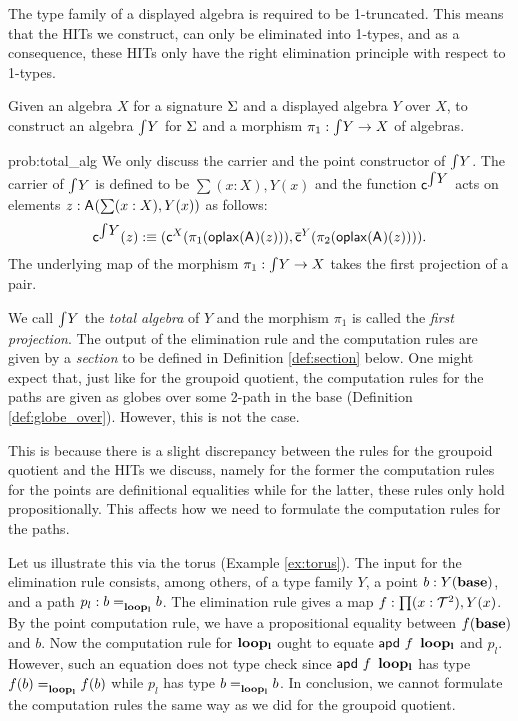 \begin{remark}
The type family of a displayed algebra is required to be 1-truncated.
This means that the HITs we construct, can only be eliminated into
1-types, and as a consequence, these HITs only have the right
elimination principle with respect to 1-types.
\end{remark}

\begin{problem}
\label{prob:total_alg}
Given an algebra $X$ for a signature $\Sigma$ and a displayed algebra $Y$ over $X$,
to construct an algebra $\textstyle \int_{}{Y}$ for $\Sigma$ and a morphism $\pi_1 : \textstyle \int_{}{Y} \rightarrow X$ of algebras.
\end{problem}

\begin{construction}{prob:total_alg}
\label{constr:total_alg}
We only discuss the carrier and the point constructor of $\textstyle \int_{}{Y}$.
The carrier of $\textstyle \int_{}{Y}$ is defined to be $\sum (x : X), Y(x)$
and the function $\mathsf{c}^{\textstyle \int_{}{Y}}$ acts on elements $z : \mathsf{A}^{}(\sum (x : X), Y(x))$ as follows:
\[
\mathsf{c}^{\textstyle \int_{}{Y}}(z) :\equiv
(\mathsf{c}^{X}(\pi_1(\mathsf{oplax}(\mathsf{A}^{})(z)))
,
\overline{\mathsf{c}}^{Y}(\pi_2(\mathsf{oplax}(\mathsf{A}^{})(z)))).
\]
The underlying map of the morphism $\pi_1 : \textstyle \int_{}{Y} \rightarrow X$ takes the first projection of a pair.
\end{construction}

We call $\textstyle \int_{}{Y}$ the \emph{total algebra} of $Y$ and the morphism $\pi_1$ is called the \emph{first projection}.
The output of the elimination rule and the computation rules are given by a \emph{section} to be defined in Definition \ref{def:section} below.
One might expect that, just like for the groupoid quotient, the computation rules for the paths
are given as globes over some 2-path in the base (Definition \ref{def:globe_over}).
However, this is not the case.

This is because there is a slight discrepancy between the rules for the groupoid quotient and the HITs we discuss,
namely for the former the computation rules for the points are definitional equalities
while for the latter, these rules only hold propositionally.
This affects how we need to formulate the computation rules for the paths.

Let us illustrate this via the torus (Example \ref{ex:torus}).
The input for the elimination rule consists, among others, of a type family $Y$, a point $b : Y(\operatorname{\mathbf{base}})$,
and a path $p_l : b =_{\operatorname{\mathbf{loop_l}}}^{} b$.
The elimination rule gives a map $f : \prod (x : \mathcal{T}^2) , Y(x)$.
By the point computation rule, we have a propositional equality between $f(\operatorname{\mathbf{base}})$ and $b$.
Now the computation rule for $\operatorname{\mathbf{loop_l}}$ ought to equate $\mathsf{apd} \ f \ \operatorname{\mathbf{loop_l}}$ and $p_l$.
However, such an equation does not type check since $\mathsf{apd} \ f \ \operatorname{\mathbf{loop_l}}$ has type $f(b) =_{\operatorname{\mathbf{loop_l}}}^{} f(b)$ while $p_l$ has type $b =_{\operatorname{\mathbf{loop_l}}}^{} b$.
In conclusion, we cannot formulate the computation rules the same way as we did for the groupoid quotient.


